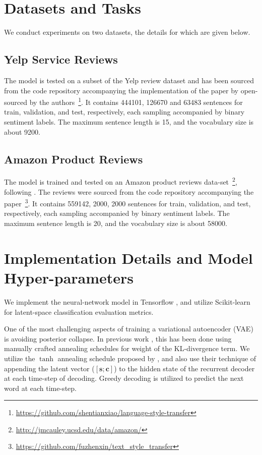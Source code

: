 \section{Datasets and Tasks} \label{sec:datasets-tasks}

We conduct experiments on two datasets, the details for which are given below.

\subsection{Yelp Service Reviews}

The model is tested on a subset of the Yelp review dataset \citep{challenge2013yelp} and has been sourced from the code repository accompanying the implementation of the paper by \cite{shen2017style} open-sourced by the authors~\footnote{\url{https://github.com/shentianxiao/language-style-transfer}}. It contains 444101, 126670 and 63483 sentences for train, validation, and test, respectively, each sampling accompanied by binary sentiment labels. The maximum sentence length is 15, and the vocabulary size is about 9200.

\subsection{Amazon Product Reviews}

The model is trained and tested on an Amazon product reviews data-set~\footnote{\url{http://jmcauley.ucsd.edu/data/amazon/}}, following \cite{fu2017style}. The reviews were sourced from the code repository accompanying the paper~\footnote{\url{https://github.com/fuzhenxin/text_style_transfer}}. It contains 559142, 2000, 2000 sentences for train, validation, and test, respectively, each sampling accompanied by binary sentiment labels. The maximum sentence length is 20, and the vocabulary size is about 58000.


\section{Implementation Details and Model Hyper-parameters}

We implement the neural-network model in Tensorflow \citep{abadi2016tensorflow}, and utilize Scikit-learn \cite{pedregosa2011scikit} for latent-space classification evaluation metrics.

One of the most challenging aspects of training a variational autoencoder (VAE) is avoiding posterior collapse. In previous work \citep{yang2017improved, bowman2016generating, bahuleyan2017variational}, this has been done using manually crafted annealing schedules for weight of the KL-divergence term. We utilize the $\tanh$ annealing schedule proposed by \cite{bahuleyan2017variational}, and also use their technique of appending the latent vector ($[\bm s; \bm c]$) to the hidden state of the recurrent decoder at each time-step of decoding. Greedy decoding is utilized to predict the next word at each time-step.

